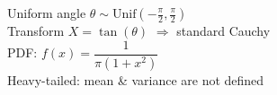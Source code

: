 \documentclass[preview]{standalone}
\begin{document}
Uniform angle $\theta \sim \text{Unif}(-\tfrac{\pi}{2}, \tfrac{\pi}{2})$\\Transform $X = \tan(\theta)$ $\Rightarrow$ standard Cauchy\\PDF: $f(x) = \dfrac{1}{\pi\left(1 + x^2\right)}$\\Heavy-tailed: mean & variance are not defined\\
\end{document}
